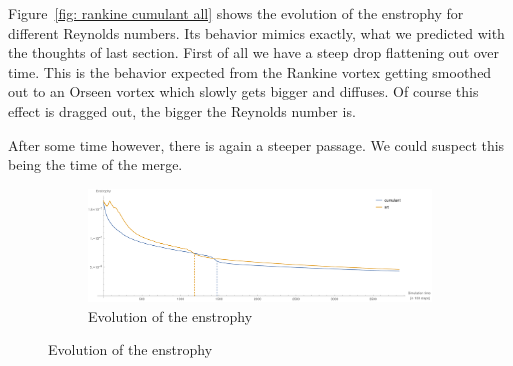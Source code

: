 Figure~\ref{fig: rankine cumulant all} shows the evolution of the enstrophy for different Reynolds numbers.
Its behavior mimics exactly, what we predicted with the thoughts of last section.
First of all we have a steep drop flattening out over time.
This is the behavior expected from the Rankine vortex getting smoothed out to an Orseen vortex which slowly gets bigger and diffuses.
Of course this effect is dragged out, the bigger the Reynolds number is.

After some time however, there is again a steeper passage.
We could suspect this being the time of the merge.

\begin{figure}
  \centering
  \begin{subfigure}[b]{\textwidth}
    \centering
    \includegraphics[width=\textwidth]{../figures/vortexMerge_enstrophy.pdf}  %
    \caption{Evolution of the enstrophy}
\label{fig: rankine result}
    \end{subfigure}%


\end{figure}
